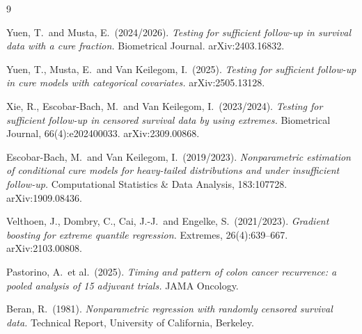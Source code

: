 \documentclass[11pt]{article}
\begin{document}
\begin{thebibliography}{9}

Yuen, T.\ and Musta, E.\ (2024/2026).
\textit{Testing for sufficient follow-up in survival data with a cure fraction.}
Biometrical Journal. arXiv:2403.16832.

Yuen, T., Musta, E.\ and Van Keilegom, I.\ (2025).
\textit{Testing for sufficient follow-up in cure models with categorical covariates.}
arXiv:2505.13128.

Xie, R., Escobar-Bach, M.\ and Van Keilegom, I.\ (2023/2024).
\textit{Testing for sufficient follow-up in censored survival data by using extremes.}
Biometrical Journal, 66(4):e202400033. arXiv:2309.00868.

Escobar-Bach, M.\ and Van Keilegom, I.\ (2019/2023).
\textit{Nonparametric estimation of conditional cure models for heavy-tailed distributions and under insufficient follow-up.}
Computational Statistics \& Data Analysis, 183:107728. arXiv:1909.08436.

Velthoen, J., Dombry, C., Cai, J.-J.\ and Engelke, S.\ (2021/2023).
\textit{Gradient boosting for extreme quantile regression.}
Extremes, 26(4):639--667. arXiv:2103.00808.

Pastorino, A.\ et al.\ (2025).
\textit{Timing and pattern of colon cancer recurrence: a pooled analysis of 15 adjuvant trials.}
JAMA Oncology.

Beran, R.\ (1981).
\textit{Nonparametric regression with randomly censored survival data.}
Technical Report, University of California, Berkeley.

\end{thebibliography}
\end{document}
